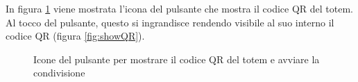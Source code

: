 In figura \ref{fig:depositIconsQR} viene mostrata l'icona del pulsante che mostra il codice QR del totem. Al tocco del pulsante, questo si ingrandisce rendendo visibile al suo interno il codice QR (figura \ref{fig:showQR}).
\begin{figure}
    \centering
    \vspace{1cm}
    \caption[Icone del QR code nel totem]{Icone del pulsante per mostrare il codice QR del totem e avviare la condivisione}
    \label{fig:depositIconsQR}
\end{figure}

